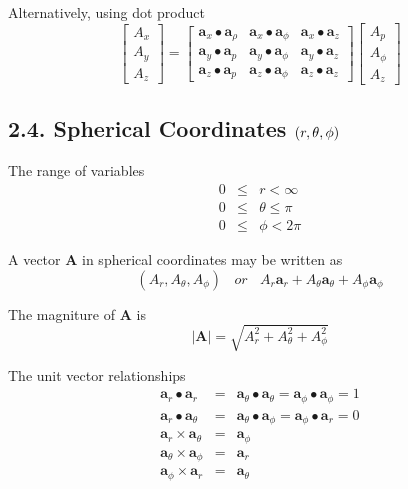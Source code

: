 \documentclass{article}
\begin{document}
Alternatively, using dot product%
\[
\left[ 
\begin{array}{c}
A_{x} \\ 
A_{y} \\ 
A_{z}%
\end{array}%
\right] =\left[ 
\begin{array}{ccc}
\mathbf{a}_{x}\bullet \mathbf{a}_{\rho } & \mathbf{a}_{x}\bullet \mathbf{a}%
_{\phi } & \mathbf{a}_{x}\bullet \mathbf{a}_{z} \\ 
\mathbf{a}_{y}\bullet \mathbf{a}_{p} & \mathbf{a}_{y}\bullet \mathbf{a}%
_{\phi } & \mathbf{a}_{y}\bullet \mathbf{a}_{z} \\ 
\mathbf{a}_{z}\bullet \mathbf{a}_{p} & \mathbf{a}_{z}\bullet \mathbf{a}%
_{\phi } & \mathbf{a}_{z}\bullet \mathbf{a}_{z}%
\end{array}%
\right] \left[ 
\begin{array}{c}
A_{p} \\ 
A_{\phi } \\ 
A_{z}%
\end{array}%
\right] 
\]

\subsection{2.4. Spherical Coordinates $\left( r,\protect\theta ,\protect%
\phi \right) $}

The range of variables 
\begin{eqnarray*}
0 &\leq &r<\infty \\
0 &\leq &\theta \leq \pi \\
0 &\leq &\phi <2\pi
\end{eqnarray*}

A vector $\mathbf{A}$ in spherical coordinates may be written as 
\[
\left( A_{r},A_{\theta },A_{\phi }\right) ~~~~or~~~~A_{r}\mathbf{a}%
_{r}+A_{\theta }\mathbf{a}_{\theta }+A_{\phi }\mathbf{a}_{\phi } 
\]

The magniture of $\mathbf{A}$ is 
\[
\left\vert \mathbf{A}\right\vert =\sqrt{A_{r}^{2}+A_{\theta }^{2}+A_{\phi
}^{2}} 
\]

The unit vector relationships 
\begin{eqnarray*}
\mathbf{a}_{r}\bullet \mathbf{a}_{r} &=&\mathbf{a}_{\theta }\bullet \mathbf{a%
}_{\theta }=\mathbf{a}_{\phi }\bullet \mathbf{a}_{\phi }=1 \\
\mathbf{a}_{r}\bullet \mathbf{a}_{\theta } &=&\mathbf{a}_{\theta }\bullet 
\mathbf{a}_{\phi }=\mathbf{a}_{\phi }\bullet \mathbf{a}_{r}=0 \\
\mathbf{a}_{r}\times \mathbf{a}_{\theta } &=&\mathbf{a}_{\phi } \\
\mathbf{a}_{\theta }\times \mathbf{a}_{\phi } &=&\mathbf{a}_{r} \\
\mathbf{a}_{\phi }\times \mathbf{a}_{r} &=&\mathbf{a}_{\theta }
\end{eqnarray*}
\end{document}
